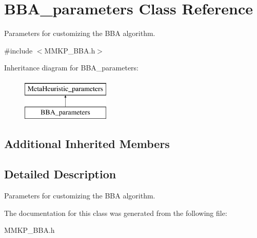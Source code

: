 \hypertarget{class_b_b_a__parameters}{\section{B\+B\+A\+\_\+parameters Class Reference}
\label{class_b_b_a__parameters}
}


Parameters for customizing the B\+B\+A algorithm.  




{\ttfamily \#include $<$M\+M\+K\+P\+\_\+\+B\+B\+A.\+h$>$}

Inheritance diagram for B\+B\+A\+\_\+parameters\+:\begin{figure}[H]
\begin{center}
\leavevmode
\includegraphics[height=2.000000cm]{class_b_b_a__parameters}
\end{center}
\end{figure}
\subsection*{Additional Inherited Members}


\subsection{Detailed Description}
Parameters for customizing the B\+B\+A algorithm. 

The documentation for this class was generated from the following file\+:\begin{DoxyCompactItemize}
\item 
M\+M\+K\+P\+\_\+\+B\+B\+A.\+h\end{DoxyCompactItemize}
